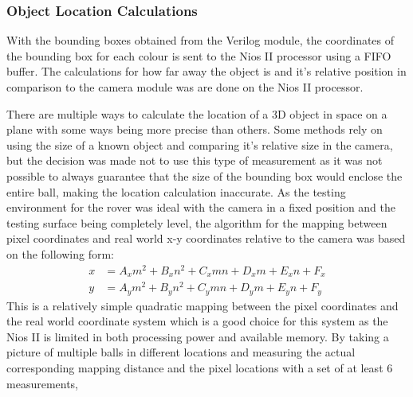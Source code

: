 \documentclass[a4paper]{article}
\begin{document}
\subsubsection{Object Location Calculations}

With the bounding boxes obtained from the Verilog module, the coordinates of the
bounding box for each colour is sent to the Nios II processor using a FIFO buffer.
The calculations for how far away the object is and it's relative position in 
comparison to the camera module was are done on the Nios II processor. 

There are multiple ways to calculate the location of a 3D object in space on a plane
with some ways being more precise than others. Some methods rely on using the 
size of a known object and comparing it's relative size in the camera, but the 
decision was made not to use this type of measurement as it was not possible to 
always guarantee that the size of the bounding box would enclose the entire ball, 
making the location calculation inaccurate. 
As the testing environment for the rover was ideal with the camera in a fixed 
position and the testing surface being completely level, the algorithm 
for the mapping between pixel coordinates and real world x-y coordinates relative
to the camera was based on the following form: \begin{align*}
    x & = A_x m^2 + B_x n^2 + C_x mn + D_x m + E_x n + F_x \\
    y & = A_y m^2 + B_y n^2 + C_y mn + D_y m + E_y n + F_y  
\end{align*} This is a relatively simple quadratic mapping between the pixel coordinates 
and the real world coordinate system which is a good choice for this system as the 
Nios II is limited in both processing power and available memory. 
By taking a picture of multiple balls in different locations and 
measuring the actual corresponding mapping distance and the pixel locations with
a set of at least 6 measurements, 
\end{document}
